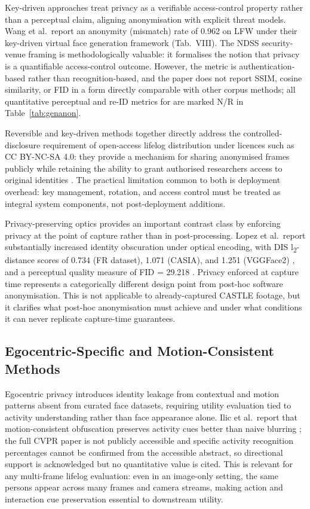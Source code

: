 \documentclass[12pt, onecolumn]{IEEEtran}
\begin{document}
Key-driven approaches treat privacy as a verifiable access-control
property rather than a perceptual claim, aligning anonymisation with
explicit threat models. Wang et al.\ report an anonymity (mismatch) rate of 0.962 on LFW under their key-driven
virtual face generation framework \cite{zhang2025keydriven} (Tab.~VIII).
The NDSS
security-venue framing is methodologically valuable: it formalises the
notion that privacy is a quantifiable access-control outcome. However,
the metric is authentication-based rather than recognition-based, and
the paper does not report SSIM, cosine similarity, or FID in a form
directly comparable with other corpus methods; all quantitative
perceptual and re-ID metrics for \cite{zhang2025keydriven} are marked
N/R in Table~\ref{tab:genanon}.

Reversible and key-driven methods together directly address the
controlled-disclosure requirement of open-access lifelog distribution
under licences such as CC BY-NC-SA 4.0: they provide a mechanism for
sharing anonymised frames publicly while retaining the ability to grant
authorised researchers access to original identities
\cite{muhammad2026refacex, zhang2025keydriven}. The practical
limitation common to both is deployment overhead: key management,
rotation, and access control must be treated as integral system
components, not post-deployment additions.

Privacy-preserving optics provides an important contrast class by
enforcing privacy at the point of capture rather than in
post-processing. Lopez et al.\ report substantially increased identity
obscuration under optical encoding, with DIS l\textsubscript{2}-distance
scores of 0.734 (FR dataset), 1.071 (CASIA), and 1.251 (VGGFace2)
\cite{lopez2024privacy}, and a perceptual quality measure of
FID = 29.218 \cite{lopez2024privacy}. Privacy enforced at capture time
represents a categorically different design point from post-hoc
software anonymisation. This is not applicable to already-captured
CASTLE footage, but it clarifies what post-hoc anonymisation must
achieve and under what conditions it can never replicate capture-time
guarantees.

\subsection{Egocentric-Specific and Motion-Consistent Methods}

Egocentric privacy introduces identity leakage from contextual and
motion patterns absent from curated face datasets, requiring utility
evaluation tied to activity understanding rather than face appearance
alone. Ilic et al.\ report that motion-consistent obfuscation preserves
activity cues better than naive blurring \cite{ilic2024selective}; the
full CVPR paper is not publicly accessible and specific activity
recognition percentages cannot be confirmed from the accessible
abstract, so directional support is acknowledged but no quantitative
value is cited. This is relevant for any multi-frame lifelog
evaluation: even in an image-only setting, the same persons appear
across many frames and camera streams, making action and interaction
cue preservation essential to downstream utility.
\end{document}
